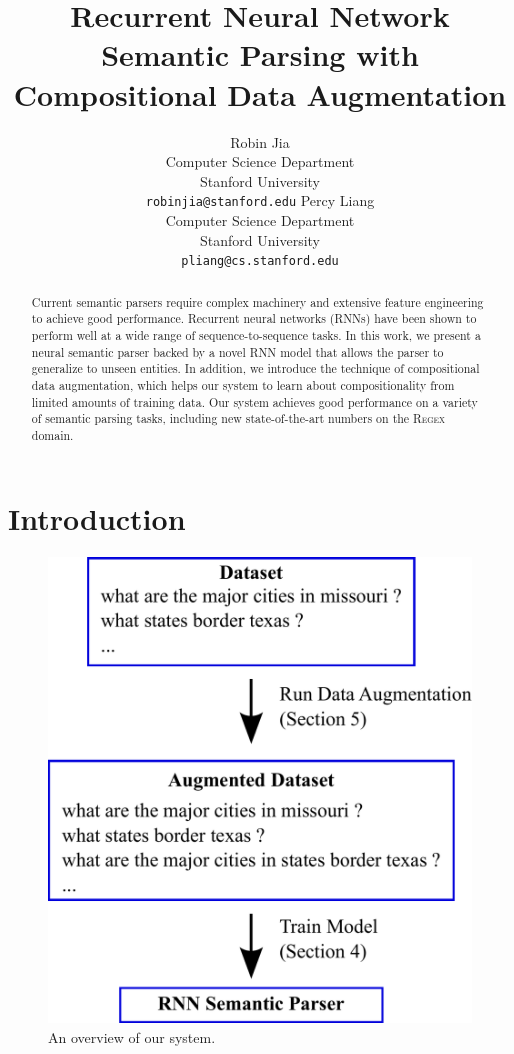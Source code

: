\documentclass[11pt,letterpaper]{article}
\title{Recurrent Neural Network Semantic Parsing
with Compositional Data Augmentation}
\author{Robin Jia\\
	    Computer Science Department\\
      Stanford University\\
	    {\tt robinjia@stanford.edu}
	  \And
    Percy Liang\\
    Computer Science Department\\
  	Stanford University\\
  {\tt pliang@cs.stanford.edu}}
\date{}
\newcommand{\regex}{\textsc{Regex}\xspace}
\begin{document}
\maketitle

\begin{abstract}
Current semantic parsers require complex machinery and
extensive feature engineering to achieve good performance.
Recurrent neural networks (RNNs)
have been shown to perform well at a wide range of sequence-to-sequence tasks.
In this work, we present a neural semantic parser
backed by a novel RNN model that allows the parser
to generalize to unseen entities.
In addition, we introduce the technique of
compositional data augmentation,
which helps our system to learn
about compositionality from limited amounts of training data.
Our system achieves good performance on a variety of semantic parsing tasks,
including new state-of-the-art numbers on the \regex domain.
\end{abstract}

\section{Introduction}
\begin{figure}[t] 
\small
\begin{center} 
  \includegraphics[scale=0.4]{fig-overview.pdf}
\end{center} 
\caption{An overview of our system.}
\label{fig:overview}
\end{figure}
\end{document}
